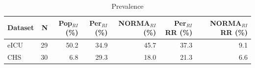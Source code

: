 \begin{table}[ht]
\centering
\footnotesize
\begin{tabular}{lrrrrrr}
\toprule
Dataset & N & Pop$_{RI}$ (\%) & Per$_{RI}$ (\%) & NORMA$_{RI}$ (\%) & Per$_{RI}$ RR (\%) & NORMA$_{RI}$ RR (\%) \\
\midrule
eICU & 29 & 50.2 & 34.9 & 45.7 & 37.3 & 9.1 \\
CHS & 30 & 6.8 & 29.3 & 18.0 & 21.3 & 6.6 \\
\bottomrule
\end{tabular}
\caption{Prevalence}
\label{tab:prevalence}
\end{table}